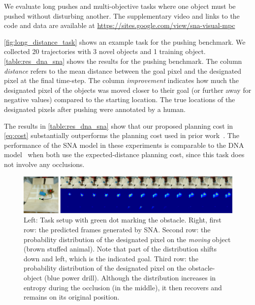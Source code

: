 We evaluate long pushes and multi-objective tasks where one object must be pushed without disturbing another. The supplementary video and links to the code and data are available at \url{https://sites.google.com/view/sna-visual-mpc}


\autoref{fig:long_distance_task} shows an example task for the pushing benchmark. We collected 20 trajectories with 3 novel objects and 1 training object. \autoref{table:res_dna_sna} shows the results for the pushing benchmark. The column \textit{distance} refers to the mean distance between the goal pixel and the designated pixel at the final time-step. The column \textit{improvement} indicates how much the designated pixel of the objects was moved closer to their goal (or further away for negative values) compared to the starting location. The true locations of the designated pixels after pushing were annotated by a human. 

The results in \autoref{table:res_dna_sna} show that our proposed planning cost in \autoref{eq:cost} substantially outperforms the planning cost used in prior work~\cite{foresight}. The performance of the SNA model in these experiments is comparable to the DNA model~\cite{foresight} when both use the expected-distance planning cost, since this task does not involve any occlusions. 
\begin{figure}
\centering
\includegraphics[width=1\linewidth]{images_sna/multiobject_qualitative/avoid_obstacle.pdf}
\caption{Left: Task setup with green dot marking the obstacle. Right, first row: the predicted frames generated by SNA. Second row: the probability distribution of the designated pixel on the \textit{moving} object (brown stuffed animal). Note that part of the distribution shifts down and left, which is the indicated goal. Third row: the probability distribution of the designated pixel on the obstacle-object (blue power drill). Although the distribution increases in entropy during the occlusion (in the middle), it then recovers and remains on its original position.
\label{fig:goingaroundocclusion}}
\end{figure}

